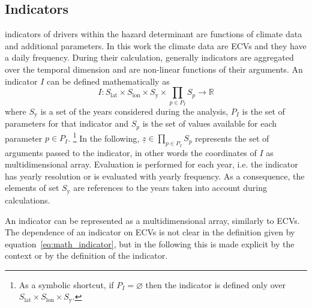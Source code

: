 \subsection{Indicators}
\label{sec:Indicators}
\Glspl{indicator} of \glspl{driver} within the \gls{hazard} \gls{determinant} are functions of climate data and additional parameters. In this work the climate data are \glspl{ECV} and they have a daily frequency.
During their calculation, generally \glspl{indicator} are aggregated over the temporal dimension and are non-linear functions of their arguments.
An \gls{indicator} $I$ can be defined mathematically as
\begin{equation}
  \label{eq:math_indicator}
  I : S_\text{lat} \times S_\text{lon} \times S_\text{y} \times \prod_{p \in P_I} S_p \to \mathbb{R}
\end{equation}
where $S_\text{y}$ is a set of the years considered during the analysis, $P_I$ is the set of parameters for that indicator and $S_p$ is the set of values available for each parameter $p \in P_I$.%
\footnote{As a symbolic shortcut, if $P_I = \varnothing$ then the indicator is defined only over $S_\text{lat} \times S_\text{lon} \times S_\text{y}$.}
In the following, $\underline{z} \in \prod_{p \in P_I} S_p$ represents the set of arguments passed to the \gls{indicator}, in other words the coordinates of $I$ as multidimensional array.
Evaluation is performed for each year, i.e. the \gls{indicator} has yearly resolution or is evaluated with yearly frequency. As a consequence, the elements of set $S_\text{y}$ are references to the years taken into account during calculations.

An \gls{indicator} can be represented as a multidimensional array, similarly to \glspl{ECV}.
The dependence of an \gls{indicator} on \glspl{ECV} is not clear in the definition given by equation~\eqref{eq:math_indicator}, but in the following this is made explicit by the context or by the definition of the \gls{indicator}.

